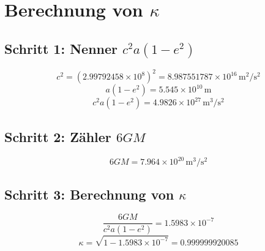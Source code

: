 \section{Berechnung von $\kappa$}
\subsection{Schritt 1: Nenner $c^2a(1-e^2)$}
\[
c^2 = (2.99792458 \times 10^8)^2 = 8.987551787 \times 10^{16}\, \text{m}^2/\text{s}^2
\]
\[
a(1-e^2) = 5.545 \times 10^{10}\, \text{m}
\]
\[
c^2 a (1-e^2) = 4.9826 \times 10^{27}\, \text{m}^3/\text{s}^2
\]

\subsection{Schritt 2: Zähler $6GM$}
\[
6GM = 7.964 \times 10^{20}\, \text{m}^3/\text{s}^2
\]

\subsection{Schritt 3: Berechnung von $\kappa$}
\[
\frac{6GM}{c^2 a (1-e^2)} = 1.5983 \times 10^{-7}
\]
\[
\kappa = \sqrt{1 - 1.5983 \times 10^{-7}} = 0.999999920085
\]